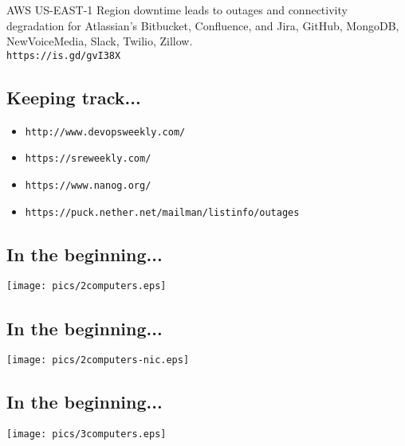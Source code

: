\documentclass[xga]{xdvislides}
\begin{document}
AWS US-EAST-1 Region downtime leads to outages and
connectivity degradation for Atlassian's Bitbucket,
Confluence, and Jira, GitHub, MongoDB, NewVoiceMedia,
Slack, Twilio, Zillow. \\

{\tt https://is.gd/gvI38X}

\subsection{Keeping track...}

\begin{itemize}
	\item {\tt http://www.devopsweekly.com/}
	\item {\tt https://sreweekly.com/}
	\item {\tt https://www.nanog.org/}
	\item {\tt https://puck.nether.net/mailman/listinfo/outages}
\end{itemize}

\subsection{In the beginning...}
\vspace*{\fill}
\begin{center}
	\texttt{[image: pics/2computers.eps]} \\
\end{center}
\vspace*{\fill}

\subsection{In the beginning...}
\vspace*{\fill}
\begin{center}
	\texttt{[image: pics/2computers-nic.eps]} \\
\end{center}
\vspace*{\fill}

\subsection{In the beginning...}
\vspace*{\fill}
\begin{center}
	\texttt{[image: pics/3computers.eps]} \\
\end{center}
\vspace*{\fill}
\end{document}

